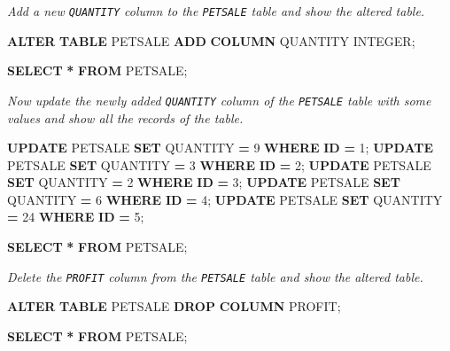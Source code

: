 \documentclass[
]{book}
\newenvironment{Shaded}{\begin{snugshade}}{\end{snugshade}}
\newcommand{\DataTypeTok}[1]{\textcolor[rgb]{0.13,0.29,0.53}{#1}}
\newcommand{\DecValTok}[1]{\textcolor[rgb]{0.00,0.00,0.81}{#1}}
\newcommand{\KeywordTok}[1]{\textcolor[rgb]{0.13,0.29,0.53}{\textbf{#1}}}
\newcommand{\NormalTok}[1]{#1}
\newcommand{\OperatorTok}[1]{\textcolor[rgb]{0.81,0.36,0.00}{\textbf{#1}}}
\begin{document}
{\emph{Add a new \texttt{QUANTITY} column to the \texttt{PETSALE} table and show the altered table.}}

\begin{Shaded}
\begin{Highlighting}[]
\KeywordTok{ALTER} \KeywordTok{TABLE}\NormalTok{ PETSALE}
\KeywordTok{ADD} \KeywordTok{COLUMN}\NormalTok{ QUANTITY }\DataTypeTok{INTEGER}\NormalTok{;}

\KeywordTok{SELECT} \OperatorTok{*} \KeywordTok{FROM}\NormalTok{ PETSALE;}
\end{Highlighting}
\end{Shaded}

{\emph{Now update the newly added \texttt{QUANTITY} column of the \texttt{PETSALE} table with some values and show all the records of the table.
}}

\begin{Shaded}
\begin{Highlighting}[]
\KeywordTok{UPDATE}\NormalTok{ PETSALE }\KeywordTok{SET}\NormalTok{ QUANTITY }\OperatorTok{=} \DecValTok{9} \KeywordTok{WHERE} \KeywordTok{ID} \OperatorTok{=} \DecValTok{1}\NormalTok{;}
\KeywordTok{UPDATE}\NormalTok{ PETSALE }\KeywordTok{SET}\NormalTok{ QUANTITY }\OperatorTok{=} \DecValTok{3} \KeywordTok{WHERE} \KeywordTok{ID} \OperatorTok{=} \DecValTok{2}\NormalTok{;}
\KeywordTok{UPDATE}\NormalTok{ PETSALE }\KeywordTok{SET}\NormalTok{ QUANTITY }\OperatorTok{=} \DecValTok{2} \KeywordTok{WHERE} \KeywordTok{ID} \OperatorTok{=} \DecValTok{3}\NormalTok{;}
\KeywordTok{UPDATE}\NormalTok{ PETSALE }\KeywordTok{SET}\NormalTok{ QUANTITY }\OperatorTok{=} \DecValTok{6} \KeywordTok{WHERE} \KeywordTok{ID} \OperatorTok{=} \DecValTok{4}\NormalTok{;}
\KeywordTok{UPDATE}\NormalTok{ PETSALE }\KeywordTok{SET}\NormalTok{ QUANTITY }\OperatorTok{=} \DecValTok{24} \KeywordTok{WHERE} \KeywordTok{ID} \OperatorTok{=} \DecValTok{5}\NormalTok{;}

\KeywordTok{SELECT} \OperatorTok{*} \KeywordTok{FROM}\NormalTok{ PETSALE;}
\end{Highlighting}
\end{Shaded}

{\emph{Delete the \texttt{PROFIT} column from the \texttt{PETSALE} table and show the altered table.
}}

\begin{Shaded}
\begin{Highlighting}[]
\KeywordTok{ALTER} \KeywordTok{TABLE}\NormalTok{ PETSALE}
\KeywordTok{DROP} \KeywordTok{COLUMN}\NormalTok{ PROFIT;}

\KeywordTok{SELECT} \OperatorTok{*} \KeywordTok{FROM}\NormalTok{ PETSALE;}
\end{Highlighting}
\end{Shaded}
\end{document}
